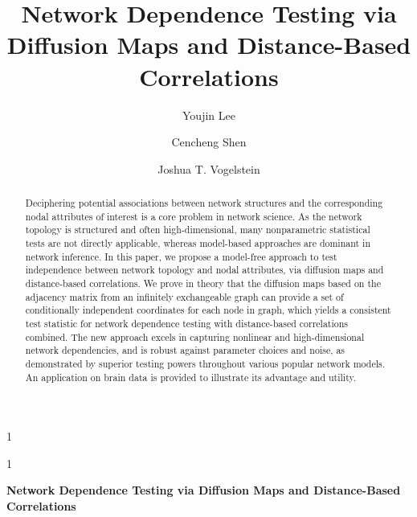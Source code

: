 \documentclass[11pt]{article}
\theoremstyle{definition}
\newcommand{\blind}{1}
\begin{document}
\def\spacingset#1{\renewcommand{\baselinestretch}%
{#1}\small\normalsize} \spacingset{1}

\title{\bf Network Dependence Testing via Diffusion Maps and Distance-Based Correlations}
\blind
{\author[1]{Youjin Lee} %
	\author[2]{Cencheng Shen} %
	\author[2,3,4]{Joshua T. Vogelstein}
  \date{}
	\maketitle
} \fi

	\blind
	{
		\bigskip
		\bigskip
		\bigskip
		\begin{center}
			{\LARGE\bf Network Dependence Testing via Diffusion Maps and Distance-Based Correlations}
		\end{center}
		\medskip
	} \fi

\begin{abstract}
Deciphering potential associations between network structures and the corresponding nodal attributes of interest is a core problem in network science. As the network topology is structured and often high-dimensional, many nonparametric statistical tests are not directly applicable, whereas model-based approaches are dominant in network inference. In this paper, we propose a model-free approach to test independence between network topology and nodal attributes, via diffusion maps and distance-based correlations. We prove in theory that the diffusion maps based on the adjacency matrix from an infinitely exchangeable graph can provide a set of conditionally independent coordinates for each node in graph, which yields a consistent test statistic for network dependence testing with distance-based correlations combined. The new approach excels in capturing nonlinear and high-dimensional network dependencies, and is robust against parameter choices and noise, as demonstrated by superior testing powers throughout various popular network models. An application on brain data is provided to illustrate its advantage and utility.
\end{abstract}
\end{document}
